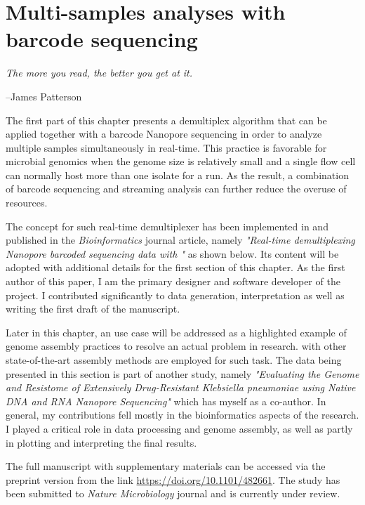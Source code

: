 \chapter{Multi-samples analyses with barcode sequencing}\label{ch:npbarcode}
\thispagestyle{empty}
\vspace*{\fill}
\epigraph{\emph{The more you read, the better you get at it.}}
{--James Patterson}

\clearpage
The first part of this chapter presents a demultiplex algorithm that can be applied together with a barcode Nanopore sequencing in order to analyze multiple samples simultaneously in real-time. This practice is favorable for microbial genomics when the genome size is relatively small and a single flow cell can normally host more than one isolate for a run. As the result, a combination of barcode sequencing and streaming analysis can further reduce the overuse of resources.

The concept for such real-time demultiplexer has been implemented in \npbarcode{} and published in the \emph{Bioinformatics} journal article, namely \emph{"Real-time demultiplexing Nanopore barcoded sequencing data with \npbarcode{}"} as shown below. Its content will be adopted with additional details for the first section of this chapter. 
As the first author of this paper, I am the primary designer and software developer of the project. I contributed significantly to data generation, interpretation as well as writing the first draft of the manuscript.

Later in this chapter, an use case will be addressed as a highlighted example of genome assembly practices to resolve an actual problem in research. \npscarf{} with other state-of-the-art assembly methods are employed for such task.
The data being presented in this section is part of another study, namely \emph{"Evaluating the Genome and Resistome of Extensively Drug-Resistant Klebsiella pneumoniae using Native DNA and RNA Nanopore Sequencing"} which has myself as a co-author. 
In general, my contributions fell mostly in the bioinformatics aspects of the research.
I played a critical role in data processing and genome assembly, as well as partly in plotting and interpreting the final results.

The full manuscript with supplementary materials can be accessed via the preprint version from the link \url{https://doi.org/10.1101/482661}. The study has been submitted to \emph{Nature Microbiology} journal and is currently under review.

